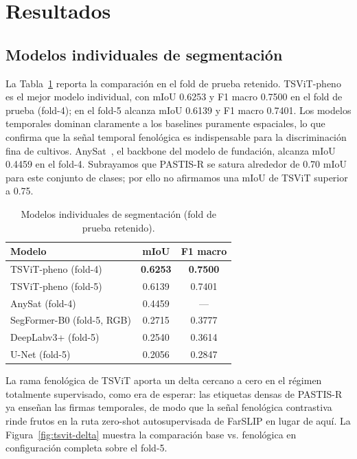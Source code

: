 \section{Resultados}
\label{sec:results}

\subsection{Modelos individuales de segmentación}
\label{sec:results-individual}
La Tabla~\ref{tab:individual} reporta la comparación en el fold de
prueba retenido. TSViT-pheno~\cite{tarasiou2023tsvit} es el mejor modelo
individual, con mIoU 0.6253 y F1 macro 0.7500 en el fold de prueba
(fold-4); en el fold-5 alcanza mIoU 0.6139 y F1 macro 0.7401. Los
modelos temporales dominan claramente a los baselines puramente
espaciales, lo que confirma que la señal temporal fenológica es
indispensable para la discriminación fina de cultivos.
AnySat~\cite{astruc2024anysat}, el backbone del modelo de fundación,
alcanza mIoU 0.4459 en el fold-4. Subrayamos que PASTIS-R se satura
alrededor de 0.70 mIoU para este conjunto de clases; por ello no
afirmamos una mIoU de TSViT superior a 0.75.

\begin{table}[htbp]
\caption{Modelos individuales de segmentación (fold de prueba retenido).}
\label{tab:individual}
\centering
\begin{tabular}{lcc}
\toprule
\textbf{Modelo} & \textbf{mIoU} & \textbf{F1 macro} \\
\midrule
TSViT-pheno (fold-4) & \textbf{0.6253} & \textbf{0.7500} \\
TSViT-pheno (fold-5) & 0.6139 & 0.7401 \\
AnySat (fold-4)      & 0.4459 & --- \\
SegFormer-B0 (fold-5, RGB) & 0.2715 & 0.3777 \\
DeepLabv3+ (fold-5)  & 0.2540 & 0.3614 \\
U-Net (fold-5)       & 0.2056 & 0.2847 \\
\bottomrule
\end{tabular}
\end{table}

La rama fenológica de TSViT aporta un delta cercano a cero en el régimen
totalmente supervisado, como era de esperar: las etiquetas densas de
PASTIS-R ya enseñan las firmas temporales, de modo que la señal
fenológica contrastiva rinde frutos en la ruta zero-shot autosupervisada
de FarSLIP en lugar de aquí. La Figura~\ref{fig:tsvit-delta} muestra la
comparación base vs. fenológica en configuración completa sobre el
fold-5.

